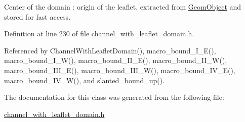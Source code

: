 Center of the domain \+: origin of the leaflet, extracted from \hyperlink{classoomph_1_1GeomObject}{Geom\+Object} and stored for fast access. 



Definition at line 230 of file channel\+\_\+with\+\_\+leaflet\+\_\+domain.\+h.



Referenced by Channel\+With\+Leaflet\+Domain(), macro\+\_\+bound\+\_\+\+I\+\_\+\+E(), macro\+\_\+bound\+\_\+\+I\+\_\+\+W(), macro\+\_\+bound\+\_\+\+I\+I\+\_\+\+E(), macro\+\_\+bound\+\_\+\+I\+I\+\_\+\+W(), macro\+\_\+bound\+\_\+\+I\+I\+I\+\_\+\+E(), macro\+\_\+bound\+\_\+\+I\+I\+I\+\_\+\+W(), macro\+\_\+bound\+\_\+\+I\+V\+\_\+\+E(), macro\+\_\+bound\+\_\+\+I\+V\+\_\+\+W(), and slanted\+\_\+bound\+\_\+up().



The documentation for this class was generated from the following file\+:\begin{DoxyCompactItemize}
\item 
\hyperlink{channel__with__leaflet__domain_8h}{channel\+\_\+with\+\_\+leaflet\+\_\+domain.\+h}\end{DoxyCompactItemize}
